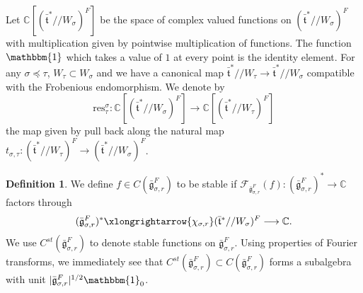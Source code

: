 \documentclass[11 pt]{article}
\numberwithin{equation}{subsection}
\theoremstyle{definition}
\newtheorem{definition}[theorem]{Definition}
\theoremstyle{remark}
\theoremstyle{conjecture}
\newcommand{\bt}{\bar{\mathfrak t}}
\newcommand{\bg}{\bar{\mathfrak g}}
\newcommand{\C}{\mathbb C}
\newcommand{\mcF}{\mathcal F}
\begin{document}
Let $\C[(\bt^*//W_\sigma)^F]$ be the space of complex valued functions on  $(\bt^*//W_\sigma)^F$
with multiplication given by pointwise multiplication of functions.  The function $\mathbbm{1}$ which takes a value of $1$ at every point is the identity element. For any $\sigma \preceq \tau$, $W_\tau \subset W_\sigma$ and we have a canonical map $ \bt^*//W_\tau \longrightarrow\bt^*//W_\sigma$ compatible with 
the Frobenious endomorphism. We denote by 
\[\mathrm{res}^{\sigma}_{\tau}:\mathbb C[(\bt^*//W_\sigma)^F]\to \mathbb C[(\bt^*//W_\tau)^F]\]
the map given by pull back along the natural 
map $t_{\sigma,\tau}: (\bt^*//W_\tau)^F \longrightarrow (\bt^*//W_\sigma)^F$. 
\begin{definition}\label{defnstablefns}
    We define $f \in C(\bg_{\sigma,r}^F)$ to be stable if $\mcF_{\bg_{\sigma,r}^F}(f):(\bg_{\sigma,r}^F)^* \rightarrow \C$ factors through 
    \[
    (\bg_{\sigma,r}^F)^* \xlongrightarrow{\chi_{\sigma,r}} (\bt^*//W_\sigma)^F \longrightarrow \C.
    \]
   We use $C^{st}(\bg_{\sigma,r}^F)$ to denote stable functions on $\bg_{\sigma,r}^F$. Using properties of Fourier transforms, we immediately see that $C^{st}(\bg_{\sigma,r}^F) \subset C(\bg_{\sigma,r}^F)$  forms a subalgebra with unit $|\bg_{\sigma,r}^F|^{1/2}\mathbbm{1}_0$. 
\end{definition}
\end{document}
